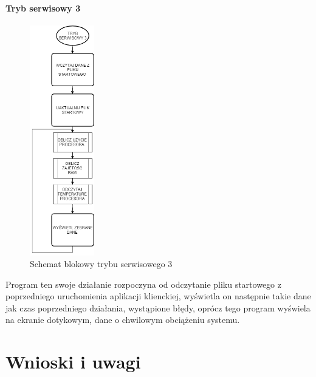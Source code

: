 \documentclass[12pt, eng, twoside, openany, final]{mgr}
\begin{document}
                    \subsubsection{Tryb serwisowy 3}
                        \begin{figure}[H]
                        \begin{center}
                            \includegraphics[width=0.25\textwidth]{t3.png}
                            \caption{Schemat blokowy trybu serwisowego 3} \label{fig:serT3}
                        \end{center}
                        \end{figure}
                        Program ten swoje działanie rozpoczyna od odczytanie pliku startowego z poprzedniego uruchomienia aplikacji klienckiej, wyświetla on następnie takie dane jak czas poprzedniego działania, wystąpione błędy, oprócz tego program wyświela na ekranie dotykowym, dane o chwilowym obciążeniu systemu.
                    
                        \newpage

\chapter{Wnioski i uwagi}
\thispagestyle{fancy}
  \cite{CleanCode,EffectiveModern,RpiBeginner}




\end{document}
